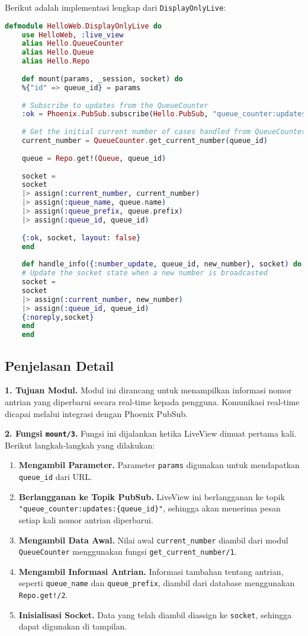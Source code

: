 Berikut adalah implementasi lengkap dari \texttt{DisplayOnlyLive}:

\begin{lstlisting}[language=Elixir, caption={lib/hello\_web/live/display\_only\_live.ex}]
	defmodule HelloWeb.DisplayOnlyLive do
	use HelloWeb, :live_view
	alias Hello.QueueCounter
	alias Hello.Queue
	alias Hello.Repo
	
	def mount(params, _session, socket) do
	%{"id" => queue_id} = params
	
	# Subscribe to updates from the QueueCounter
	:ok = Phoenix.PubSub.subscribe(Hello.PubSub, "queue_counter:updates:#{queue_id}")
	
	# Get the initial current number of cases handled from QueueCounter
	current_number = QueueCounter.get_current_number(queue_id)
	
	queue = Repo.get!(Queue, queue_id)
	
	socket =
	socket
	|> assign(:current_number, current_number)
	|> assign(:queue_name, queue.name)
	|> assign(:queue_prefix, queue.prefix)
	|> assign(:queue_id, queue_id)
	
	{:ok, socket, layout: false}
	end
	
	def handle_info({:number_update, queue_id, new_number}, socket) do
	# Update the socket state when a new number is broadcasted
	socket =
	socket
	|> assign(:current_number, new_number)
	|> assign(:queue_id, queue_id)
	{:noreply,socket}
	end
	end
\end{lstlisting}

\subsection{Penjelasan Detail}

\textbf{1. Tujuan Modul.} Modul ini dirancang untuk menampilkan informasi nomor antrian yang diperbarui secara real-time kepada pengguna. Komunikasi real-time dicapai melalui integrasi dengan Phoenix PubSub.

\textbf{2. Fungsi \texttt{mount/3}.} Fungsi ini dijalankan ketika LiveView dimuat pertama kali. Berikut langkah-langkah yang dilakukan:
\begin{enumerate}
	\item \textbf{Mengambil Parameter.} Parameter \texttt{params} digunakan untuk mendapatkan \texttt{queue\_id} dari URL.
	\item \textbf{Berlangganan ke Topik PubSub.} LiveView ini berlangganan ke topik \texttt{"queue\_counter:updates:\{queue\_id\}"}, sehingga akan menerima pesan setiap kali nomor antrian diperbarui.
	\item \textbf{Mengambil Data Awal.} Nilai awal \texttt{current\_number} diambil dari modul \texttt{QueueCounter} menggunakan fungsi \texttt{get\_current\_number/1}.
	\item \textbf{Mengambil Informasi Antrian.} Informasi tambahan tentang antrian, seperti \texttt{queue\_name} dan \texttt{queue\_prefix}, diambil dari database menggunakan \texttt{Repo.get!/2}.
	\item \textbf{Inisialisasi Socket.} Data yang telah diambil diassign ke \texttt{socket}, sehingga dapat digunakan di tampilan.
\end{enumerate}

